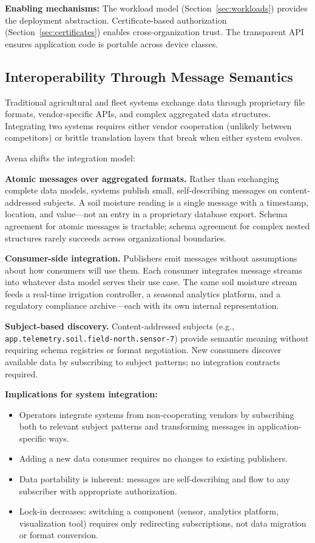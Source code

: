 \textbf{Enabling mechanisms:} The workload model (Section~\ref{sec:workloads}) provides the deployment abstraction. Certificate-based authorization (Section~\ref{sec:certificates}) enables cross-organization trust. The transparent API ensures application code is portable across device classes.

\subsection{Interoperability Through Message Semantics}

Traditional agricultural and fleet systems exchange data through proprietary file formats, vendor-specific APIs, and complex aggregated data structures. Integrating two systems requires either vendor cooperation (unlikely between competitors) or brittle translation layers that break when either system evolves.

Avena shifts the integration model:

\textbf{Atomic messages over aggregated formats.} Rather than exchanging complete data models, systems publish small, self-describing messages on content-addressed subjects. A soil moisture reading is a single message with a timestamp, location, and value---not an entry in a proprietary database export. Schema agreement for atomic messages is tractable; schema agreement for complex nested structures rarely succeeds across organizational boundaries.

\textbf{Consumer-side integration.} Publishers emit messages without assumptions about how consumers will use them. Each consumer integrates message streams into whatever data model serves their use case. The same soil moisture stream feeds a real-time irrigation controller, a seasonal analytics platform, and a regulatory compliance archive---each with its own internal representation.

\textbf{Subject-based discovery.} Content-addressed subjects (e.g., \texttt{app.telemetry.soil.field-north.sensor-7}) provide semantic meaning without requiring schema registries or format negotiation. New consumers discover available data by subscribing to subject patterns; no integration contracts required.

\textbf{Implications for system integration:}
\begin{itemize}[nosep]
    \item Operators integrate systems from non-cooperating vendors by subscribing both to relevant subject patterns and transforming messages in application-specific ways.
    \item Adding a new data consumer requires no changes to existing publishers.
    \item Data portability is inherent: messages are self-describing and flow to any subscriber with appropriate authorization.
    \item Lock-in decreases: switching a component (sensor, analytics platform, visualization tool) requires only redirecting subscriptions, not data migration or format conversion.
\end{itemize}

